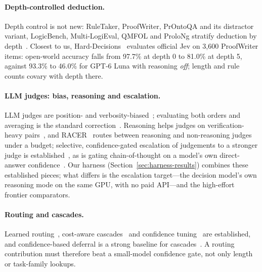 \paragraph{Depth-controlled deduction.}
Depth control is not new: RuleTaker, ProofWriter, PrOntoQA and its distractor variant, LogicBench, Multi-LogiEval, QMFOL and ProloNg stratify deduction by depth~\citep{ruletaker2020,proofwriter2021,prontoqa2023,prontoqaood2023,logicbench2024,multilogieval2024,qmfol2026,prolong2026}.
Closest to us, Hard-Decisions~\citep{harddecisions2026} evaluates official Jev on 3{,}600 ProofWriter items: open-world accuracy falls from 97.7\% at depth 0 to 81.0\% at depth 5, against 93.3\% to 46.0\% for GPT-6 Luna with reasoning \emph{off}; length and rule counts covary with depth there.

\paragraph{LLM judges: bias, reasoning and escalation.}
LLM judges are position- and verbosity-biased~\citep{mtbench2023,fairevaluators2024,judgingjudges2025}; evaluating both orders and averaging is the standard correction~\citep{fairevaluators2024}.
Reasoning helps judges on verification-heavy pairs~\citep{explicitreasoningjudges2025}, and RACER~\citep{racer2026} routes between reasoning and non-reasoning judges under a budget; selective, confidence-gated escalation of judgements to a stronger judge is established~\citep{trustorescalate2025,askstrongjudge2025}, as is gating chain-of-thought on a model's own direct-answer confidence~\citep{confgatedcot2025}.
Our harness (Section~\ref{sec:harness-results}) combines these established pieces; what differs is the escalation target---the decision model's own reasoning mode on the same GPU, with no paid API---and the high-effort frontier comparators.

\paragraph{Routing and cascades.}
Learned routing~\citep{routellm2024,routereval2025,routerarena2025,rerouting2025}, cost-aware cascades~\citep{frugalgpt2023,tokencascade2024} and confidence tuning~\citep{gatekeeper2025} are established, and confidence-based deferral is a strong baseline for cascades~\citep{cascadedeferral2023}.
A routing contribution must therefore beat a small-model confidence gate, not only length or task-family lookups.

